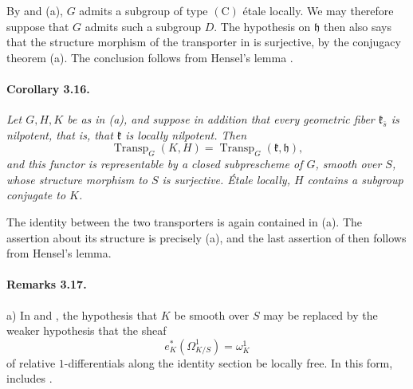 By  and \textup{(a)}, \(G\) admits a subgroup of type
\((\mathrm C)\) étale locally. We may therefore suppose that \(G\)
admits such a subgroup \(D\). The hypothesis on \(\mathfrak h\)
then also says that the structure morphism of the transporter in
 is surjective, by the conjugacy theorem \textup{(a)}.
The conclusion follows from Hensel's lemma .



\paragraph{\textbf{Corollary 3.16.}}
{\itshape Let \(G,H,K\) be as in \textup{(a)}, and suppose in
addition that every geometric fiber \(\mathfrak k_{\bar s}\) is
nilpotent, that is, that \(\mathfrak k\) is locally nilpotent. Then
\[
  \operatorname{Transp}_G(K,H)
  =
  \operatorname{Transp}_G(\mathfrak k,\mathfrak h),
\]
and this functor is representable by a closed subprescheme of
\(G\), smooth over \(S\), whose structure morphism to \(S\) is
surjective. Étale locally, \(H\) contains a subgroup conjugate to
\(K\).}

The identity between the two transporters is again contained in
\textup{(a)}. The assertion about its structure is precisely
\textup{(a)}, and the last assertion of  then follows from
Hensel's lemma.

\paragraph{\textbf{Remarks 3.17.}}
\textup{a)}
In  and , the hypothesis that \(K\) be smooth over \(S\)
may be replaced by the weaker hypothesis that the sheaf
\[
  e_K^*(\Omega^1_{K/S})=\omega^1_K
\]
of relative \(1\)-differentials along the identity section be
locally free. In this form,  includes .

